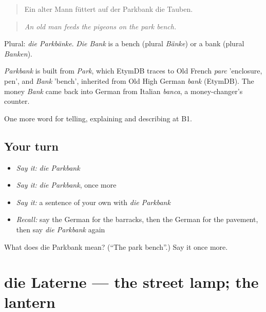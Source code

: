\begin{quote}
Ein alter Mann füttert auf der Parkbank die Tauben.
\end{quote}

\begin{quote}
\emph{An old man feeds the pigeons on the park bench.}
\end{quote}

Plural: \emph{die Parkbänke}. \emph{Die Bank} is a bench (plural \emph{Bänke}) or a bank (plural \emph{Banken}).

\begin{cousinweb}
\emph{Parkbank} is built from \emph{Park}, which EtymDB traces to Old French \emph{parc} 'enclosure, pen', and \emph{Bank} 'bench', inherited from Old High German \emph{bank} (EtymDB). The money \emph{Bank} came back into German from Italian \emph{banca}, a money-changer's counter.
\end{cousinweb}

\begin{grammarlens}[title={What you've built}]
One more word for telling, explaining and describing at B1.
\end{grammarlens}

\subsection*{Your turn}
\begin{itemize}
\raggedright
  \item \emph{Say it:} \emph{die Parkbank}
  \item \emph{Say it:} \emph{die Parkbank}, once more
  \item \emph{Say it:} a sentence of your own with \emph{die Parkbank}
  \item \emph{Recall:} say the German for the barracks, then the German for the pavement, then say \emph{die Parkbank} again
\end{itemize}

\begin{tcolorbox}[breakable,colback=teal!4,colframe=teal!35!black,title={Before you move on}]
What does die Parkbank mean? (\textquotedblleft{}The park bench\textquotedblright{}.) Say it once more.
\end{tcolorbox}
\section[die Laterne]{die Laterne — the street lamp; the lantern}

